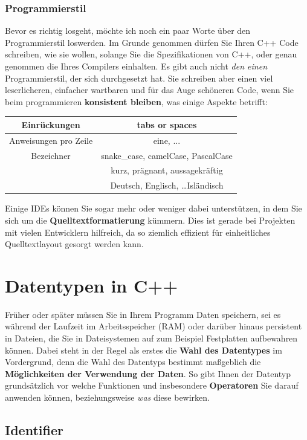 \documentclass[a4paper]{report}
\begin{document}
\subsection{Programmierstil}
Bevor es richtig losgeht, möchte ich noch ein paar Worte über den Programmierstil loswerden. Im Grunde genommen dürfen Sie Ihren C++ Code schreiben, wie sie wollen, solange Sie die Spezifikationen von C++, oder genau genommen die Ihres Compilers einhalten. Es gibt auch nicht \textit{den einen} Programmierstil, der sich durchgesetzt hat. Sie schreiben aber einen viel leserlicheren, einfacher wartbaren und für das Auge schöneren Code, wenn Sie beim programmieren \textbf{konsistent bleiben}, was einige Aspekte betrifft:
\begin{center}
	\begin{tabular}{|c||c|}
		\hline
		Einrückungen	&	tabs or spaces \\ \hline
		Anweisungen pro Zeile & eine, ... \\ \hline
		Bezeichner		&	snake\_case, camelCase, PascalCase \\
		& kurz, prägnant, aussagekräftig \\ 
		& Deutsch, Englisch, \dots Isländisch \\ \hline
	\end{tabular}
\end{center}
Einige IDEs können Sie sogar mehr oder weniger dabei unterstützen, in dem Sie sich um die \textbf{Quelltextformatierung} kümmern. Dies ist gerade bei Projekten mit vielen Entwicklern hilfreich, da so ziemlich effizient für einheitliches Quelltextlayout gesorgt werden kann.


\chapter{Datentypen in C++} \label{real_start}

Früher oder später müssen Sie in Ihrem Programm Daten speichern, sei es während der Laufzeit im Arbeitsspeicher (RAM) oder darüber hinaus persistent in Dateien, die Sie in Dateisystemen auf zum Beispiel Festplatten aufbewahren können. Dabei steht in der Regel als erstes die \textbf{Wahl des Datentypes} im Vordergrund, denn die Wahl des Datentyps bestimmt maßgeblich die \textbf{Möglichkeiten der Verwendung der Daten}. So gibt Ihnen der Datentyp grundsätzlich vor welche Funktionen und insbesondere \textbf{Operatoren} Sie darauf anwenden können, beziehungsweise \textit{was} diese bewirken.

\section{Identifier}
\end{document}

